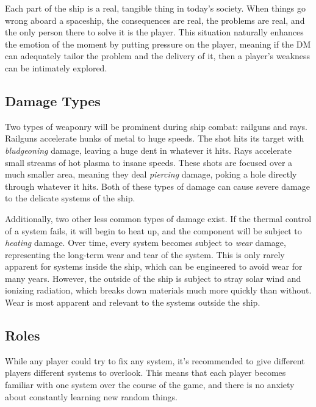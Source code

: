 \documentclass[a4paper]{article}
\begin{document}
Each part of the ship is a real, tangible thing in today's society. When things go wrong aboard a spaceship, the consequences are real, the problems are real, and the only person there to solve it is the player. This situation naturally enhances the emotion of the moment by putting pressure on the player, meaning if the DM can adequately tailor the problem and the delivery of it, then a player's weakness can be intimately explored.

\subsection{Damage Types} \label{damage_types}

Two types of weaponry will be prominent during ship combat: railguns and rays. Railguns accelerate hunks of metal to huge speeds. The shot hits its target with \textit{bludgeoning} damage, leaving a huge dent in whatever it hits. Rays accelerate small streams of hot plasma to insane speeds. These shots are focused over a much smaller area, meaning they deal \textit{piercing} damage, poking a hole directly through whatever it hits. Both of these types of damage can cause severe damage to the delicate systems of the ship.

Additionally, two other less common types of damage exist. If the thermal control of a system fails, it will begin to heat up, and the component will be subject to \textit{heating} damage. Over time, every system becomes subject to \textit{wear} damage, representing the long-term wear and tear of the system. This is only rarely apparent for systems inside the ship, which can be engineered to avoid wear for many years. However, the outside of the ship is subject to stray solar wind and ionizing radiation, which breaks down materials much more quickly than without. Wear is most apparent and relevant to the systems outside the ship.

\subsection{Roles} \label{roles}

While any player could try to fix any system, it's recommended to give different players different systems to overlook. This means that each player becomes familiar with one system over the course of the game, and there is no anxiety about constantly learning new random things. 
\end{document}
